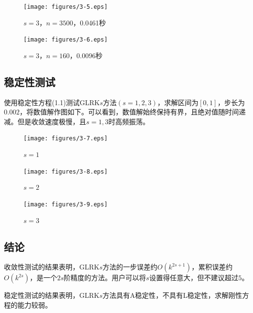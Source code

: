 \documentclass[lang=cn,10pt,bibend=bibtex]{elegantbook}
\begin{document}
\begin{figure}[H]
  \centering
  \begin{minipage}[t]{0.33\linewidth}
      \centering
      \texttt{[image: figures/3-5.eps]}
      \caption*{\small $s=3$，$n=3500$，0.0461秒}
  \end{minipage}
  \hspace{1em}
  \begin{minipage}[t]{0.33\linewidth}
      \centering
      \texttt{[image: figures/3-6.eps]}
      \caption*{\small $s=3$，$n=160$，0.0096秒}
  \end{minipage}
\end{figure}

\subsection{稳定性测试}

使用稳定性方程(1.1)测试GLRK$s$方法$(s=1,2,3)$，求解区间为$[0,1]$，步长为$0.002$，将数值解作图如下。可以看到，数值解始终保持有界，且绝对值随时间递减。但是收敛速度极慢，且$s=1,3$时高频振荡。

\begin{figure}[H]
  \centering
  \begin{minipage}[t]{0.32\linewidth}
      \centering
      \texttt{[image: figures/3-7.eps]}
      \caption*{$s=1$}
  \end{minipage}
  \hspace{.3em}
  \begin{minipage}[t]{0.32\linewidth}
      \centering
      \texttt{[image: figures/3-8.eps]}
      \caption*{$s=2$}
  \end{minipage}
  \hspace{.3em}
  \begin{minipage}[t]{0.32\linewidth}
      \centering
      \texttt{[image: figures/3-9.eps]}
      \caption*{$s=3$}
  \end{minipage}
\end{figure}

\subsection{结论}

收敛性测试的结果表明，GLRK$s$方法的一步误差约$O(k^{2s+1})$，累积误差约$O(k^{2s})$，是一个$2s$阶精度的方法。用户可以将$s$设置得任意大，但不建议超过$5$。

稳定性测试的结果表明，GLRK$s$方法具有A稳定性，不具有L稳定性，求解刚性方程的能力较弱。
\end{document}
